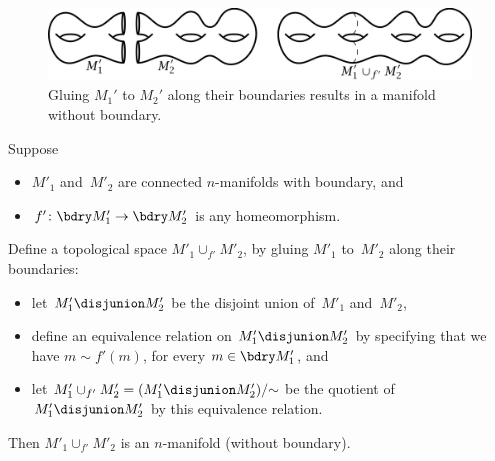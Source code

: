 \begin{figure}[ht]
 \includegraphics{PDF/hybrid.jpg}
 \caption{Gluing $M_1'$ to $M_2'$ along their boundaries
results in a manifold without boundary.}
 \label{hybridfig}
 \end{figure}
%
%
%
%
%
%
%
%
%
%

\begin{prop}
 Suppose 
 \begin{itemize}
 \item $M'_1$ and~$M'_2$ are connected $n$-manifolds with
boundary, and
 \item $f' \colon \bdry M'_1 \to \bdry M'_2$ is any
homeomorphism.
 \end{itemize}
 Define a topological space $M'_1 \cup_{f'} M'_2$, by gluing
$M'_1$ to~$M'_2$ along their boundaries:
 \begin{itemize}
 \item let $M'_1 \disjunion M'_2$ be the disjoint union
of~$M'_1$ and~$M'_2$,
 \item define an equivalence relation on $M'_1 \disjunion
M'_2$ by specifying that we have $m \sim f'(m)$, for every $m \in
\bdry M'_1$, and
 \item let $M'_1 \cup_{f'} M'_2 = (M'_1 \disjunion
M'_2)/\mathord{\sim}$ be the quotient of $M'_1 \disjunion
M'_2$ by this equivalence relation.
 \end{itemize}
 Then $M'_1 \cup_{f'} M'_2$ is an $n$-manifold
\textup(without boundary\textup).
 \end{prop}

